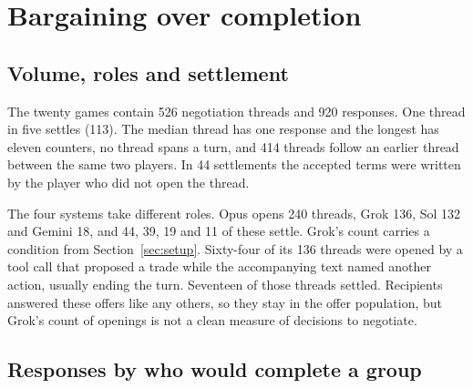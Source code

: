 \section{Bargaining over completion}
\label{sec:bargaining}

\subsection{Volume, roles and settlement}

The twenty games contain 526 negotiation threads and 920 responses. One thread in five settles (113). The median thread has one response and the longest has eleven counters, no thread spans a turn, and 414 threads follow an earlier thread between the same two players. In 44 settlements the accepted terms were written by the player who did not open the thread.

The four systems take different roles. Opus opens 240 threads, Grok 136, Sol 132 and Gemini 18, and 44, 39, 19 and 11 of these settle. Grok's count carries a condition from Section~\ref{sec:setup}. Sixty-four of its 136 threads were opened by a tool call that proposed a trade while the accompanying text named another action, usually ending the turn. Seventeen of those threads settled. Recipients answered these offers like any others, so they stay in the offer population, but Grok's count of openings is not a clean measure of decisions to negotiate.

\subsection{Responses by who would complete a group}
\label{sec:cells}

